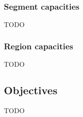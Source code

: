 \subsubsection{Segment capacities}
\label{collisions}

TODO


\subsubsection{Region capacities}
\label{capacities}

TODO

\subsection{Objectives}
\label{objectives}

TODO

